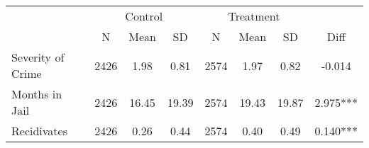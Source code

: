 \begin{tabular}{lccccccc}
\hline  & \multicolumn{3}{c}{Control} & \multicolumn{3}{c}{Treatment} & \\
 & N & Mean & SD & N & Mean & SD & Diff\\
\hline Severity of Crime & 2426 & 1.98 & 0.81 & 2574 & 1.97 & 0.82 & -0.014\\
Months in Jail & 2426 & 16.45 & 19.39 & 2574 & 19.43 & 19.87 & 2.975***\\
Recidivates & 2426 & 0.26 & 0.44 & 2574 & 0.40 & 0.49 & 0.140***\\
\hline\end{tabular}\\
\hfil\\
